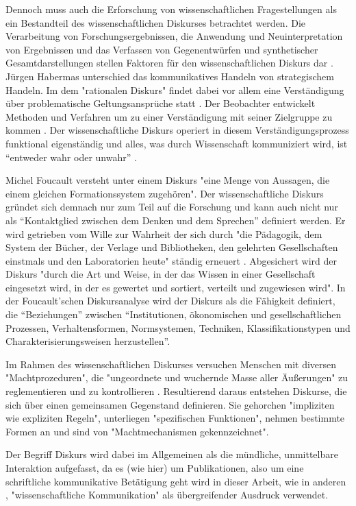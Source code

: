 Dennoch muss auch die Erforschung von wissenschaftlichen Fragestellungen als ein Bestandteil des wissenschaftlichen Diskurses\cite{suchen} betrachtet werden. Die Verarbeitung von Forschungsergebnissen, die Anwendung und Neuinterpretation von Ergebnissen und das Verfassen von Gegenentwürfen und synthetischer Gesamtdarstellungen stellen Faktoren für den wissenschaftlichen Diskurs dar \cite{suchen}. Jürgen Habermas unterschied das kommunikatives Handeln von strategischem Handeln. Im dem "rationalen Diskurs" findet dabei vor allem eine Verständigung über problematische Geltungsansprüche statt \cite{suchen}. Der Beobachter entwickelt Methoden und Verfahren um zu einer Verständigung mit seiner Zielgruppe zu kommen \cite{suchen}. Der wissenschaftliche Diskurs operiert in diesem Verständigungsprozess funktional eigenständig und alles, was durch Wissenschaft kommuniziert wird, ist “entweder wahr oder unwahr” \cite{Luhmann1998}.

Michel Foucault versteht unter einem Diskurs "eine Menge von Aussagen, die einem gleichen Formationssystem zugehören"\cite{foucault_archaologie_1981}. Der wissenschaftliche Diskurs gründet sich demnach nur zum Teil auf die Forschung und kann auch nicht nur als “Kontaktglied zwischen dem Denken und dem Sprechen” \cite{foucault_ordnung_2003} definiert werden. Er wird getrieben vom Wille zur Wahrheit der sich durch "die Pädagogik, dem System der Bücher, der Verlage und Bibliotheken, den gelehrten Gesellschaften einstmals und den Laboratorien heute" ständig erneuert \cite{foucault_ordnung_2003}. Abgesichert wird der Diskurs "durch die Art und Weise, in der das Wissen in einer Gesellschaft eingesetzt wird, in der es gewertet und sortiert, verteilt und zugewiesen wird"\cite{foucault_ordnung_2003}. In der Foucault'schen Diskursanalyse wird der Diskurs als die Fähigkeit definiert, die “Beziehungen” zwischen “Institutionen, ökonomischen und gesellschaftlichen Prozessen, Verhaltensformen, Normsystemen, Techniken, Klassifikationstypen und Charakterisierungsweisen herzustellen”\cite{foucault_archaologie_1981}.

Im Rahmen des wissenschaftlichen Diskurses versuchen Menschen mit diversen "Machtprozeduren", die "ungeordnete und wuchernde Masse aller Äußerungen" zu reglementieren und zu kontrollieren \cite{Neymeyer_diskurs_2010}. Resultierend daraus entstehen Diskurse, die sich über einen gemeinsamen Gegenstand definieren. Sie gehorchen "impliziten wie expliziten Regeln", unterliegen "spezifischen Funktionen", nehmen bestimmte Formen an und sind von "Machtmechanismen gekennzeichnet". \cite{Neymeyer_diskurs_2010}

Der Begriff Diskurs wird dabei im Allgemeinen als die mündliche, unmittelbare Interaktion aufgefasst, da es (wie hier) um Publikationen, also um eine schriftliche kommunikative Betätigung geht wird in dieser Arbeit, wie in anderen \cite{graefen2007_wissenschaftliche_artikel}, "wissenschaftliche Kommunikation" als übergreifender Ausdruck verwendet.
